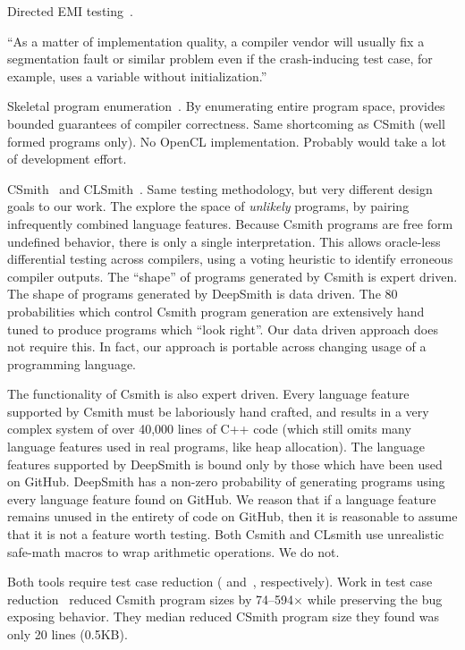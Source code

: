 Directed EMI testing~\cite{Le2015}.


``As a matter of implementation quality, a compiler vendor will usually fix a segmentation fault or similar problem even if the crash-inducing test case, for example, uses a variable without initialization.''~\cite{Regehr2012a}

Skeletal program enumeration~\cite{Zhang2016a}. By enumerating entire program space, provides bounded guarantees of compiler correctness. Same shortcoming as CSmith (well formed programs only). No OpenCL implementation. Probably would take a lot of development effort. 

CSmith~\cite{Yang2011} and CLSmith~\cite{Lidbury2015a}. Same testing methodology, but very different design goals to our work. The explore the space of \emph{unlikely} programs, by pairing infrequently combined language features. Because Csmith programs are free form undefined behavior, there is only a single interpretation. This allows oracle-less differential testing across compilers, using a voting heuristic to identify erroneous compiler outputs. The ``shape'' of programs generated by Csmith is expert driven. The shape of programs generated by DeepSmith is data driven. The 80 probabilities which control Csmith program generation are extensively hand tuned to produce programs which ``look right''. Our data driven approach does not require this. In fact, our approach is portable across changing usage of a programming language.

The functionality of Csmith is also expert driven. Every language feature supported by Csmith must be laboriously hand crafted, and results in a very complex system of over 40,000 lines of C++ code (which still omits many language features used in real programs, like heap allocation). The language features supported by DeepSmith is bound only by those which have been used on GitHub. DeepSmith has a non-zero probability of generating programs using every language feature found on GitHub. We reason that if a language feature remains unused in the entirety of code on GitHub, then it is reasonable to assume that it is not a feature worth testing. Both Csmith and CLsmith use unrealistic safe-math macros to wrap arithmetic operations. We do not.

Both tools require test case reduction (\cite{Regehr2012a} and~\cite{Pflanzer2016}, respectively). Work in test case reduction~\cite{Regehr2012a} reduced Csmith program sizes by 74--594$\times$ while preserving the bug exposing behavior. They median reduced CSmith program size they found was only 20 lines (0.5KB).

